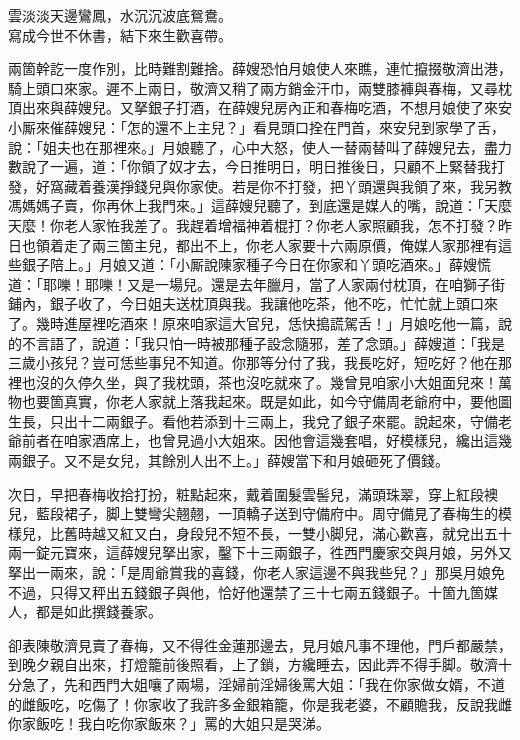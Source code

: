 \begin{myquote}
雲淡淡天邊鸞鳳，水沉沉波底鴛鴦。\\寫成今世不休書，結下來生歡喜帶。
\end{myquote}

兩箇幹訖一度作別，比時難割難捨。{}薛嫂恐怕月娘使人來瞧，連忙攛掇敬濟出港，騎上頭口來家。遲不上兩日，敬濟又稍了兩方銷金汗巾，兩雙膝褲與春梅，又尋枕頂出來與薛嫂兒。又拏銀子打酒，在薛嫂兒房內正和春梅吃酒，不想月娘使了來安小厮來催薛嫂兒：「怎的還不上主兒？」看見頭口拴在門首，來安兒到家學了舌，說：「姐夫也在那裡來。」月娘聽了，心中大怒，使人一替兩替叫了薛嫂兒去，盡力數說了一遍，道：「你領了奴才去，今日推明日，明日推後日，只顧不上緊替我打發，好窩藏着養漢掙錢兒與你家使。若是你不打發，把丫頭還與我領了來，我另教馮媽媽子賣，你再休上我門來。」這薛嫂兒聽了，到底還是媒人的嘴，說道：「天麼天麼！你老人家恠我差了。我趕着增福神着棍打？你老人家照顧我，怎不打發？昨日也領着走了兩三箇主兒，都出不上，你老人家要十六兩原價，俺媒人家那裡有這些銀子陪上。」{}月娘又道：「小厮說陳家種子今日在你家和丫頭吃酒來。」薛嫂慌道：「耶嚛！耶嚛！又是一場兒。還是去年臘月，當了人家兩付枕頂，在咱獅子街鋪內，銀子收了，今日姐夫送枕頂與我。我讓他吃茶，他不吃，忙忙就上頭口來了。幾時進屋裡吃酒來！原來咱家這大官兒，恁快搗謊駕舌！」月娘吃他一篇，說的不言語了，說道：「我只怕一時被那種子設念隨邪，差了念頭。」薛嫂道：「我是三歲小孩兒？豈可恁些事兒不知道。你那等分付了我，我長吃好，短吃好？他在那裡也沒的久停久坐，與了我枕頭，茶也沒吃就來了。幾曾見咱家小大姐面兒來！萬物也要箇真實，你老人家就上落我起來。既是如此，如今守備周老爺府中，要他圖生長，只出十二兩銀子。看他若添到十三兩上，我兌了銀子來罷。說起來，守備老爺前者在咱家酒席上，也曾見過小大姐來。因他會這幾套唱，好模樣兒，纔出這幾兩銀子。又不是女兒，其餘別人出不上。」薛嫂當下和月娘砸死了價錢。

次日，早把春梅收拾打扮，粧點起來，戴着圍髮雲髻兒，滿頭珠翠，穿上紅段襖兒，藍段裙子，脚上雙彎尖翹翹，一頂轎子送到守備府中。周守備見了春梅生的模樣兒，比舊時越又紅又白，身段兒不短不長，一雙小脚兒，滿心歡喜，{}就兌出五十兩一錠元寶來，這薛嫂兒拏出家，鑿下十三兩銀子，徃西門慶家交與月娘，另外又拏出一兩來，說：「是周爺賞我的喜錢，你老人家這邊不與我些兒？」那吳月娘免不過，只得又秤出五錢銀子與他，恰好他還禁了三十七兩五錢銀子。十箇九箇媒人，都是如此撰錢養家。

卻表陳敬濟見賣了春梅，又不得徃金蓮那邊去，見月娘凡事不理他，門戶都嚴禁，到晚夕親自出來，打燈籠前後照看，上了鎖，方纔睡去，因此弄不得手脚。敬濟十分急了，先和西門大姐嚷了兩場，{}淫婦前淫婦後罵大姐：「我在你家做女婿，不道的雌飯吃，吃傷了！你家收了我許多金銀箱籠，你是我老婆，不顧贍我，反說我雌你家飯吃！我白吃你家飯來？」罵的大姐只是哭涕。

